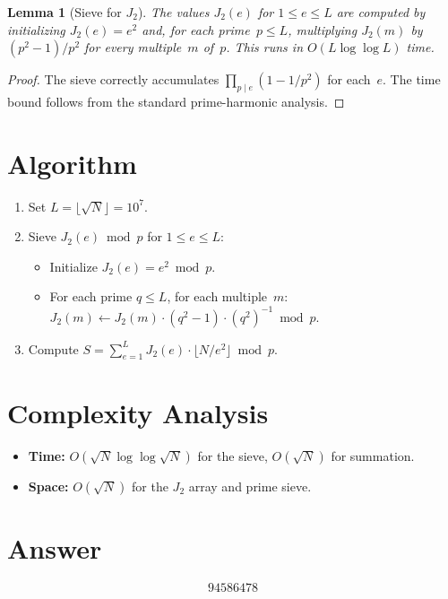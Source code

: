 \documentclass[11pt]{article}
\newtheorem{lemma}[theorem]{Lemma}
\theoremstyle{definition}
\begin{document}
\begin{lemma}[Sieve for $J_2$]
The values $J_2(e)$ for $1 \le e \le L$ are computed by initializing $J_2(e) = e^2$ and, for each prime~$p \le L$, multiplying $J_2(m)$ by $(p^2-1)/p^2$ for every multiple~$m$ of~$p$. This runs in $O(L\log\log L)$ time.
\end{lemma}

\begin{proof}
The sieve correctly accumulates $\prod_{p \mid e}(1-1/p^2)$ for each~$e$. The time bound follows from the standard prime-harmonic analysis.
\end{proof}

\section{Algorithm}

\begin{enumerate}
\item Set $L = \lfloor\sqrt{N}\rfloor = 10^7$.
\item Sieve $J_2(e) \bmod p$ for $1 \le e \le L$:
  \begin{itemize}
  \item Initialize $J_2(e) = e^2 \bmod p$.
  \item For each prime $q \le L$, for each multiple~$m$: $J_2(m) \leftarrow J_2(m) \cdot (q^2-1) \cdot (q^2)^{-1} \bmod p$.
  \end{itemize}
\item Compute $S = \sum_{e=1}^{L} J_2(e) \cdot \lfloor N/e^2\rfloor \bmod p$.
\end{enumerate}

\section{Complexity Analysis}

\begin{itemize}
\item \textbf{Time:} $O(\sqrt{N}\log\log\sqrt{N})$ for the sieve, $O(\sqrt{N})$ for summation.
\item \textbf{Space:} $O(\sqrt{N})$ for the $J_2$ array and prime sieve.
\end{itemize}

\section{Answer}

\[
\boxed{94586478}
\]
\end{document}
